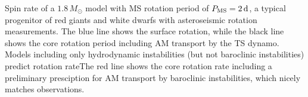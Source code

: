  \label{fig:MRI1p8rot} Spin rate of a $1.8 \, M_\odot$ model with MS rotation period of $P_{\rm MS} = 2 \, {\rm d}$, a typical progenitor of red giants and white dwarfs with asteroseismic rotation measurements. The blue line shows the surface rotation, while the black line shows the core rotation period including AM transport by the TS dynamo. Models including only hydrodynamic instabilities (but not baroclinic instabilities) predict rotation rateThe red line shows the core rotation rate including a preliminary presciption for AM transport by baroclinic instabilities, which nicely matches observations.